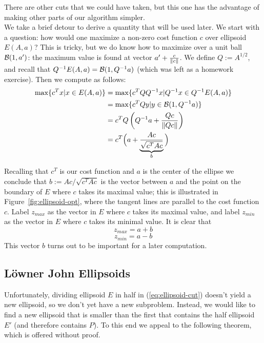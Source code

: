 There are other cuts that we could have taken, but this one has the advantage of
making other parts of our algorithm simpler.\\

We take a brief detour to derive a quantity that will be used later. We start
with a question: how would one maximize a non-zero cost function \(c\) over
ellipsoid \(E(A,a)\)? This is tricky, but we do know how to maximize over a unit
ball \(\mathcal{B}(1, a')\): the maximum value is found at vector \(a' +
\frac{c}{\left\lVert c\right\rVert}\). We define \(Q := A^{1/2}\), and recall that \(Q^{-1}E(A,a)
= \mathcal{B}(1, Q^{-1}a)\) (which was left as a homework exercise). Then we compute
as follows:
\begin{align*}
  \max\{c^T x | x \in E(A,a)\} &= \max\{c^T Q Q^{-1} x | Q^{-1}x \in Q^{-1} E(A,a)\}\\
    &= \max\{c^T Q y | y \in \mathcal{B}(1, Q^{-1}a)\}\\
    &= c^T Q\left(Q^{-1}a + \frac{Qc}{\left\lVert Qc\right\rVert}\right)\\
    &= c^T\Big(a + \underbrace{\frac{Ac}{\sqrt{c^TAc}}}_b\Big)
\end{align*}

Recalling that \(c^T\) is our cost function and \(a\) is the center of the
ellipse we conclude that \(b := Ac / \sqrt{c^T A c}\) is the vector between
\(a\) and the point on the boundary of \(E\) where \(c\) takes its maximal
value; this is illustrated in Figure~\ref{fig:ellipsoid-opt}, where the tangent
lines are parallel to the cost function \(c\).  Label \(z_{max}\) as the vector
in \(E\) where \(c\) takes its maximal value, and label \(z_{min}\) as the
vector in \(E\) where \(c\) takes its minimal value. It is clear that
\[z_{max} = a + b\]
\[z_{min} = a - b\]
This vector \(b\) turns
out to be important for a later computation.

\subsection{L\"owner John Ellipsoids}
Unfortunately, dividing ellipsoid \(E\) in half in (\ref{eq:ellipsoid-cut})
doesn't yield a new ellipsoid, so we don't yet have a new subproblem. Instead,
we would like to find a new ellipsoid that is smaller than the first that
contains the half ellipsoid \(E'\) (and therefore contains \(P\)).  To this end
we appeal to the following theorem, which is offered without proof.

